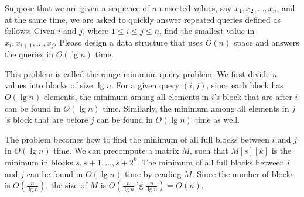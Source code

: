 \begin{Exercise}[title={Range minimum query problem},origin={NCTU BIOINFO 100},difficulty=1]
Suppose that we are given a sequence of $n$ unsorted values, say $x_1, x_2, \dots, x_n$, and at the same time, we are asked to quickly answer repeated queries defined as follows: Given $i$ and $j$, where $1 \leq i \leq j \leq n$, find the smallest value in $x_i, x_{i+1}, \dots, x_j$. Please design a data structure that uses $O(n)$ space and answers the queries in $O(\lg n)$ time.
\end{Exercise}
\begin{Answer}
This problem is called the \href{https://en.wikipedia.org/wiki/Range_minimum_query}{range minimum query problem}. 
We first divide $n$ values into blocks of size $\lg n$.
For a given query $(i, j)$, since each block has $O(\lg n)$ elements, the minimum among all elements in $i$'s block that are after $i$ can be found in $O(\lg n)$ time.
Similarly, the minimum among all elements in $j$'s block that are before $j$ can be found in $O(\lg n)$ time as well.

The problem becomes how to find the minimum of all full blocks between $i$ and $j$ in $O(\lg n)$ time.
We can precompute a matrix $M$, such that $M[s][k]$ is the minimum in blocks $s, s + 1, \dots, s + 2^k$.
The minimum of all full blocks between $i$ and $j$ can be found in $O(\lg n)$ time by reading $M$.
Since the number of blocks is $O(\frac{n}{\lg n})$, the size of $M$ is $O(\frac{n}{\lg n} \lg \frac{n}{\lg n}) = O(n)$.
\end{Answer}

\printbibliography[heading=subbibliography]
